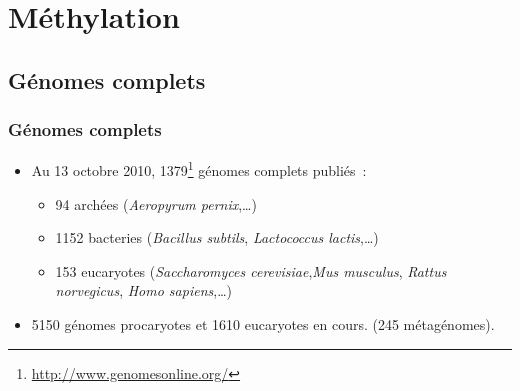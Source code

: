 \documentclass{beamer}
\begin{document}

\section{Méthylation} %
\label{sec:methylation}


\subsection{Génomes complets}
\begin{frame}
  \frametitle{Génomes complets}
  \begin{itemize}
  \item Au 13 octobre 2010, 1379\footnote{\url{http://www.genomesonline.org/}} génomes complets publiés~:
    \begin{itemize}
    \item 94 archées (\textit{Aeropyrum pernix},\ldots)
    \item 1152 bacteries (\textit{Bacillus subtils}, \textit{Lactococcus lactis},\ldots)
    \item 153 eucaryotes (\textit{Saccharomyces cerevisiae},\textit{Mus musculus}, \textit{Rattus norvegicus}, \textit{Homo sapiens},\ldots)
    \end{itemize}
  \item 5150 génomes procaryotes et 1610 eucaryotes en cours. (245 métagénomes).
  \end{itemize}
\end{frame}
\end{document}
